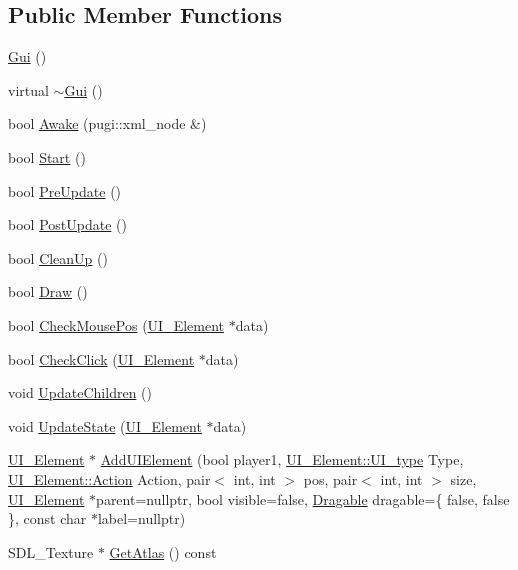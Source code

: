 \subsection*{Public Member Functions}
\begin{DoxyCompactItemize}
\item 
\mbox{\hyperlink{class_gui_ab2655dbb6d3a91d7e90cb83dad6c0450}{Gui}} ()
\item 
virtual \mbox{\hyperlink{class_gui_a4fd8485d226f9b8a2ac2d81d7f0f3598}{$\sim$\+Gui}} ()
\item 
bool \mbox{\hyperlink{class_gui_adcbbb73f8357c13664a1638857683e00}{Awake}} (pugi\+::xml\+\_\+node \&)
\item 
bool \mbox{\hyperlink{class_gui_ab62e1b47c26df1e5a69932becb0cc1de}{Start}} ()
\item 
bool \mbox{\hyperlink{class_gui_a0909298219825317830f462bec002d5b}{Pre\+Update}} ()
\item 
bool \mbox{\hyperlink{class_gui_a49d5bf6fa118544dd5827f0412d5968d}{Post\+Update}} ()
\item 
bool \mbox{\hyperlink{class_gui_aefd3608cd8ada040443efcffb1f316f3}{Clean\+Up}} ()
\item 
bool \mbox{\hyperlink{class_gui_a87a850ab175f2ccb095fd2c033b4780c}{Draw}} ()
\item 
bool \mbox{\hyperlink{class_gui_ab0a87905fba215e5334f80cb94fe9f77}{Check\+Mouse\+Pos}} (\mbox{\hyperlink{class_u_i___element}{U\+I\+\_\+\+Element}} $\ast$data)
\item 
bool \mbox{\hyperlink{class_gui_a77030d749cc47c605b43e2212596c90f}{Check\+Click}} (\mbox{\hyperlink{class_u_i___element}{U\+I\+\_\+\+Element}} $\ast$data)
\item 
void \mbox{\hyperlink{class_gui_a2e8ad76d16dbdf87bc4f2a77dc759613}{Update\+Children}} ()
\item 
void \mbox{\hyperlink{class_gui_a8b39af1511a827ff4d3d4dbdd4cb7576}{Update\+State}} (\mbox{\hyperlink{class_u_i___element}{U\+I\+\_\+\+Element}} $\ast$data)
\item 
\mbox{\hyperlink{class_u_i___element}{U\+I\+\_\+\+Element}} $\ast$ \mbox{\hyperlink{class_gui_acc48dc0f342bdb1c94a7cf29bc0ede2d}{Add\+U\+I\+Element}} (bool player1, \mbox{\hyperlink{class_u_i___element_a7ed595c46c75d53d30fa3813b036cf1e}{U\+I\+\_\+\+Element\+::\+U\+I\+\_\+type}} Type, \mbox{\hyperlink{class_u_i___element_ae179047d98a379f4e0dcdf0871c7b8d6}{U\+I\+\_\+\+Element\+::\+Action}} Action, pair$<$ int, int $>$ pos, pair$<$ int, int $>$ size, \mbox{\hyperlink{class_u_i___element}{U\+I\+\_\+\+Element}} $\ast$parent=nullptr, bool visible=false, \mbox{\hyperlink{struct_dragable}{Dragable}} dragable=\{ false, false \}, const char $\ast$label=nullptr)
\item 
S\+D\+L\+\_\+\+Texture $\ast$ \mbox{\hyperlink{class_gui_a950aff1c9c025edbf3b765ff77ec4c5d}{Get\+Atlas}} () const
\end{DoxyCompactItemize}
